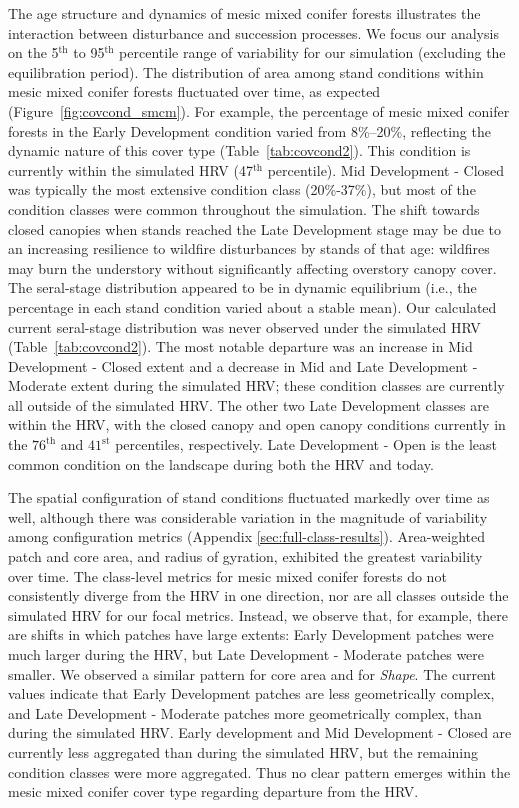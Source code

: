 The age structure and dynamics of mesic mixed conifer forests illustrates the interaction between disturbance and succession processes. We focus our analysis on the 5$^{\text{th}}$ to 95$^{\text{th}}$ percentile range of variability for our simulation (excluding the equilibration period). %
%
The distribution of area among stand conditions within mesic mixed conifer forests fluctuated over time, as expected (Figure~\ref{fig:covcond_smcm}). For example, the percentage of mesic mixed conifer forests in the Early Development condition varied from 8\%--20\%, reflecting the dynamic nature of this cover type (Table~\ref{tab:covcond2}). This condition is currently within the simulated HRV (47$^{\text{th}}$ percentile). Mid Development - Closed was typically the most extensive condition class (20\%-37\%), but most of the condition classes were common throughout the simulation. The shift towards closed canopies when stands reached the Late Development stage may be due to an increasing resilience to wildfire disturbances by stands of that age: wildfires may burn the understory without significantly affecting overstory canopy cover. %
%
The seral-stage distribution appeared to be in dynamic equilibrium (i.e., the percentage in each stand condition varied about a stable mean). Our calculated current seral-stage distribution was never observed under the simulated HRV (Table~\ref{tab:covcond2}). The most notable departure was an increase in Mid Development - Closed extent and a decrease in Mid and Late Development - Moderate extent during the simulated HRV; these condition classes are currently all outside of the simulated HRV. The other two Late Development classes are within the HRV, with the closed canopy and open canopy conditions currently in the $76^{\text{th}}$ and $41^{\text{st}}$ percentiles, respectively. Late Development - Open is the least common condition on the landscape during both the HRV and today.

The spatial configuration of stand conditions fluctuated markedly over time as well, although there was considerable variation in the magnitude of variability among configuration metrics (Appendix \ref{sec:full-class-results}). Area-weighted patch and core area, and radius of gyration, exhibited the greatest variability over time. The class-level metrics for mesic mixed conifer forests do not consistently diverge from the HRV in one direction, nor are all classes outside the simulated HRV for our focal metrics. Instead, we observe that, for example, there are shifts in which patches have large extents: Early Development patches were much larger during the HRV, but Late Development - Moderate patches were smaller. We observed a similar pattern for core area and for \emph{Shape}. The current values indicate that Early Development patches are less geometrically complex, and Late Development - Moderate patches more geometrically complex, than during the simulated HRV. Early development and Mid Development - Closed are currently less aggregated than during the simulated HRV, but the remaining condition classes were more aggregated. Thus no clear pattern emerges within the mesic mixed conifer cover type regarding departure from the HRV.


